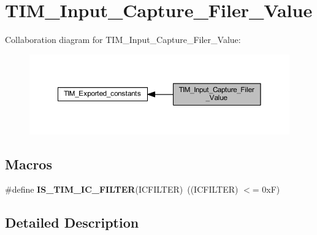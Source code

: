 \hypertarget{group___t_i_m___input___capture___filer___value}{}\section{T\+I\+M\+\_\+\+Input\+\_\+\+Capture\+\_\+\+Filer\+\_\+\+Value}
\label{group___t_i_m___input___capture___filer___value}
Collaboration diagram for T\+I\+M\+\_\+\+Input\+\_\+\+Capture\+\_\+\+Filer\+\_\+\+Value\+:\nopagebreak
\begin{figure}[H]
\begin{center}
\leavevmode
\includegraphics[width=350pt]{group___t_i_m___input___capture___filer___value}
\end{center}
\end{figure}
\subsection*{Macros}
\begin{DoxyCompactItemize}
\item 
\mbox{\label{group___t_i_m___input___capture___filer___value_ga19ecc5fc2e1ce1697c3dbbb9809ca243}} 
\#define {\bfseries I\+S\+\_\+\+T\+I\+M\+\_\+\+I\+C\+\_\+\+F\+I\+L\+T\+ER}(I\+C\+F\+I\+L\+T\+ER)~((I\+C\+F\+I\+L\+T\+ER) $<$= 0x\+F)
\end{DoxyCompactItemize}


\subsection{Detailed Description}
